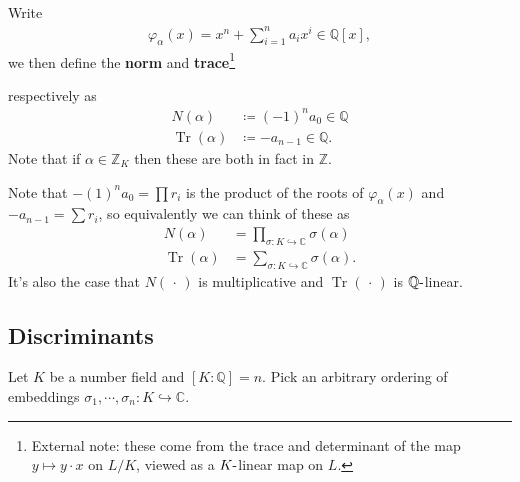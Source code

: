 \begin{definition}

Write
\begin{align*}
\varphi_{ \alpha} (x) = x^n + \sum_{i=1}^n a_i x^i \in {\mathbb{Q}}[x]
,\end{align*}
we then define the \textbf{norm} and \textbf{trace}\footnote{External
  note: these come from the trace and determinant of the map
  \(y \mapsto y\cdot x\) on \(L/K\), viewed as a \(K{\hbox{-}}\)linear
  map on \(L\).}

respectively as
\begin{align*}
N( \alpha) &\coloneqq(-1)^n a_0 \in {\mathbb{Q}}\\
\operatorname{Tr}( \alpha) &\coloneqq-a_{n-1} \in {\mathbb{Q}}
.\end{align*}
Note that if \(\alpha \in {\mathbb{Z}}_K\) then these are both in fact
in \({\mathbb{Z}}\).

\end{definition}

\begin{remark}

Note that \(-(1)^n a_0 = \prod r_i\) is the product of the roots of
\(\varphi_{ \alpha} (x)\) and \(-a_{n-1} = \sum r_i\), so equivalently
we can think of these as
\begin{align*}
N( \alpha ) &= \prod_{ \sigma: K \hookrightarrow{\mathbb{C}}} \sigma( \alpha) \\
\operatorname{Tr}( \alpha ) &= \sum_{\sigma: K \hookrightarrow{\mathbb{C}}} \sigma( \alpha) 
.\end{align*}
It's also the case that \(N({\,\cdot\,})\) is multiplicative and
\(\operatorname{Tr}({\,\cdot\,})\) is \({\mathbb{Q}}{\hbox{-}}\)linear.

\end{remark}

\hypertarget{discriminants}{%
\subsection{Discriminants}\label{discriminants}}

Let \(K\) be a number field and \([K : {\mathbb{Q}}] = n\). Pick an
arbitrary ordering of embeddings
\(\sigma_1, \cdots, \sigma_n: K \hookrightarrow{\mathbb{C}}\).


